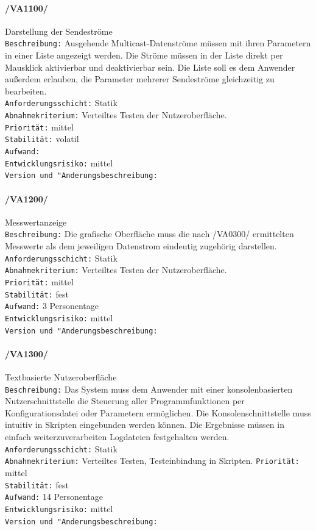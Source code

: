 \paragraph{/VA1100/} Darstellung der Sendeströme\\
\texttt{Beschreibung:} Ausgehende Multicast-Datenströme müssen mit ihren
Parametern in einer Liste angezeigt werden. Die Ströme müssen in der Liste
direkt per Mausklick aktivierbar und deaktivierbar sein. Die Liste soll es dem
Anwender außerdem erlauben, die Parameter mehrerer Sendeströme gleichzeitig zu
bearbeiten.\\
\texttt{Anforderungsschicht:} Statik\\
\texttt{Abnahmekriterium:} Verteiltes Testen der Nutzeroberfläche.\\
\texttt{Priorität:} mittel\\
\texttt{Stabilität:} volatil\\
\texttt{Aufwand:}\\
\texttt{Entwicklungsrisiko:} mittel\\
\texttt{Version und "Anderungsbeschreibung:}

\paragraph{/VA1200/} Messwertanzeige\\
\texttt{Beschreibung:} Die grafische Oberfläche muss die nach /VA0300/
ermittelten Messwerte als dem jeweiligen Datenstrom eindeutig zugehörig
darstellen.\\
\texttt{Anforderungsschicht:} Statik\\
\texttt{Abnahmekriterium:} Verteiltes Testen der Nutzeroberfläche.\\
\texttt{Priorität:} mittel\\
\texttt{Stabilität:} fest\\
\texttt{Aufwand:} 3 Personentage\\
\texttt{Entwicklungsrisiko:} mittel\\
\texttt{Version und "Anderungsbeschreibung:}

\paragraph{/VA1300/} Textbasierte Nutzeroberfläche\\
\texttt{Beschreibung:} Das System muss dem Anwender mit einer konsolenbasierten
Nutzerschnittstelle die Steuerung aller Programmfunktionen per
Konfigurationsdatei oder Parametern ermöglichen. Die Konsolenschnittstelle muss
intuitiv in Skripten eingebunden werden können. Die Ergebnisse müssen in einfach weiterzuverarbeiten
Logdateien festgehalten werden.\\
\texttt{Anforderungsschicht:} Statik\\
\texttt{Abnahmekriterium:} Verteiltes Testen, Testeinbindung in Skripten.
\texttt{Priorität:} mittel\\
\texttt{Stabilität:} fest\\
\texttt{Aufwand:} 14 Personentage\\
\texttt{Entwicklungsrisiko:} mittel\\
\texttt{Version und "Anderungsbeschreibung:}

